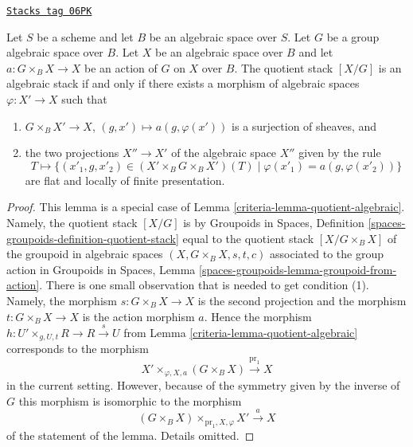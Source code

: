 \begin{lemma}
\label{criteria-lemma-group-quotient-algebraic}
\href{https://stacks.math.columbia.edu/tag/06PK}{\texttt{Stacks tag 06PK}}

Let $S$ be a scheme and let $B$ be an algebraic space over $S$.
Let $G$ be a group algebraic space over $B$.
Let $X$ be an algebraic space over $B$ and let $a : G \times_B X \to X$
be an action of $G$ on $X$ over $B$.
The quotient stack $[X/G]$ is an algebraic stack if and only if
there exists a morphism of algebraic spaces $\varphi : X' \to X$ such that
\begin{enumerate}
\item $G \times_B X' \to X$, $(g, x') \mapsto a(g, \varphi(x'))$ is a
surjection of sheaves, and
\item the two projections $X'' \to X'$ of the algebraic space $X''$
given by the rule
$$
T \longmapsto \{(x'_1, g, x'_2) \in (X' \times_B G \times_B X')(T)
\mid \varphi(x'_1) = a(g, \varphi(x'_2))\}
$$
are flat and locally of finite presentation.
\end{enumerate}
\end{lemma}

\begin{proof}

This lemma is a special case of
Lemma \ref{criteria-lemma-quotient-algebraic}.
Namely, the quotient stack $[X/G]$ is by
Groupoids in Spaces, Definition \ref{spaces-groupoids-definition-quotient-stack}
equal to the quotient stack $[X/G \times_B X]$ of the groupoid in
algebraic spaces $(X, G \times_B X, s, t, c)$ associated to
the group action in
Groupoids in Spaces, Lemma \ref{spaces-groupoids-lemma-groupoid-from-action}.
There is one small observation that is needed to get condition (1).
Namely, the morphism $s : G \times_B X \to X$ is the second projection
and the morphism $t :  G \times_B X \to X$ is the action morphism $a$.
Hence the morphism $h : U' \times_{g, U, t} R \to R \xrightarrow{s} U$ from
Lemma \ref{criteria-lemma-quotient-algebraic}
corresponds to the morphism
$$
X' \times_{\varphi, X, a} (G \times_B X) \xrightarrow{\text{pr}_1} X
$$
in the current setting. However, because of the symmetry given by
the inverse of $G$ this morphism is isomorphic to the morphism
$$
(G \times_B X) \times_{\text{pr}_1, X, \varphi} X' \xrightarrow{a} X
$$
of the statement of the lemma. Details omitted.
\end{proof}

